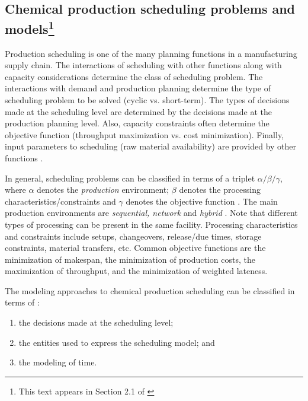 \subsection{Chemical production scheduling problems and models\footnote{This text appears in Section 2.1 of
\citet{subramanian:maravelias:rawlings:2012}}}


Production scheduling is one of the many planning functions in a
manufacturing supply chain. The interactions of scheduling with other
functions along with capacity considerations determine the class of
scheduling problem. The interactions with demand and production
planning determine the type of scheduling problem to be solved (cyclic
vs. short-term). The types of decisions made at the scheduling level
are determined by the decisions made at the production planning
level. Also, capacity constraints often determine the objective
function (\eg throughput maximization vs. cost minimization). Finally,
input parameters to scheduling (\eg raw material availability) are
provided by other functions \citep{maravelias:sung:2009,
  maravelias:2012, stadtler:2005}.

In general, scheduling problems can be classified in terms of a
triplet $\alpha/\beta/\gamma$, where $\alpha$ denotes the
{\emph{production}} environment; $\beta$ denotes the processing
characteristics/constraints and $\gamma$ denotes the objective
function \citep{pinedo:2008}. The main production environments are
{\emph{sequential, network}} and {\emph{hybrid}}
\citep{maravelias:2012}. Note that different types of processing can
be present in the same facility. Processing characteristics and
constraints include setups, changeovers, release/due times, storage
constraints, material transfers, etc. Common objective functions are
the minimization of makespan, the minimization of production costs,
the maximization of throughput, and the minimization of weighted lateness.

The modeling approaches to chemical production scheduling can be
classified in terms of \citep{maravelias:2012}:

\begin{enumerate}
\item the decisions made at the scheduling level;
\item the entities used to express the scheduling model; and
\item the modeling of time.
\end{enumerate}

